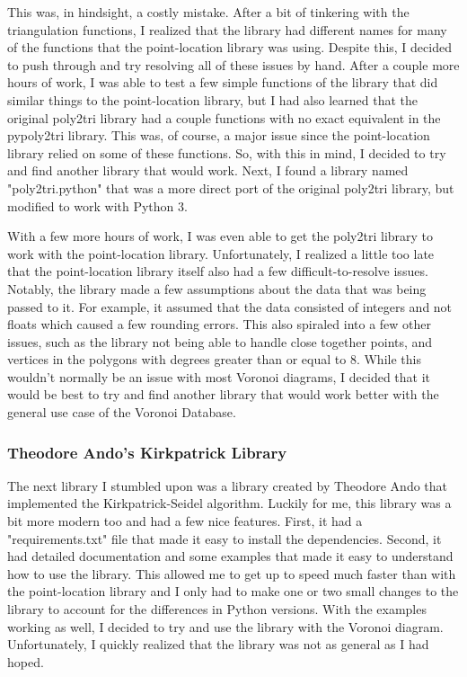 \documentclass{article}
\begin{document}
\noindent
This was, in hindsight, a costly mistake. After a bit of tinkering with the triangulation functions, I realized that the library had different names for many of the functions that the point-location library was using. Despite this, I decided to push through and try resolving all of these issues by hand. After a couple more hours of work, I was able to test a few simple functions of the library that did similar things to the point-location library, but I had also learned that the original poly2tri library had a couple functions with no exact equivalent in the pypoly2tri library. This was, of course, a major issue since the point-location library relied on some of these functions. So, with this in mind, I decided to try and find another library that would work. Next, I found a library named "poly2tri.python" that was a more direct port of the original poly2tri library, but modified to work with Python 3.
\newline

\noindent
With a few more hours of work, I was even able to get the poly2tri library to work with the point-location library. Unfortunately, I realized a little too late that the point-location library itself also had a few difficult-to-resolve issues. Notably, the library made a few assumptions about the data that was being passed to it. For example, it assumed that the data consisted of integers and not floats which caused a few rounding errors. This also spiraled into a few other issues, such as the library not being able to handle close together points, and vertices in the polygons with degrees greater than or equal to 8. While this wouldn't normally be an issue with most Voronoi diagrams, I decided that it would be best to try and find another library that would work better with the general use case of the Voronoi Database.

\subsubsection{Theodore Ando's Kirkpatrick Library}
The next library I stumbled upon was a library created by Theodore Ando that implemented the Kirkpatrick-Seidel
algorithm\cite{thedorekirkpatrick}. Luckily for me, this library was a bit more modern too and had a few nice features. First, it had a "requirements.txt" file that made it easy to install the dependencies. Second, it had detailed documentation and some examples that made it easy to understand how to use the library. This allowed me to get up to speed much faster than with the point-location library and I only had to make one or two small changes to the library to account for the differences in Python versions. With the examples working as well, I decided to try and use the library with the Voronoi diagram. Unfortunately, I quickly realized that the library was not as general as I had hoped.
\newline    
\end{document}
